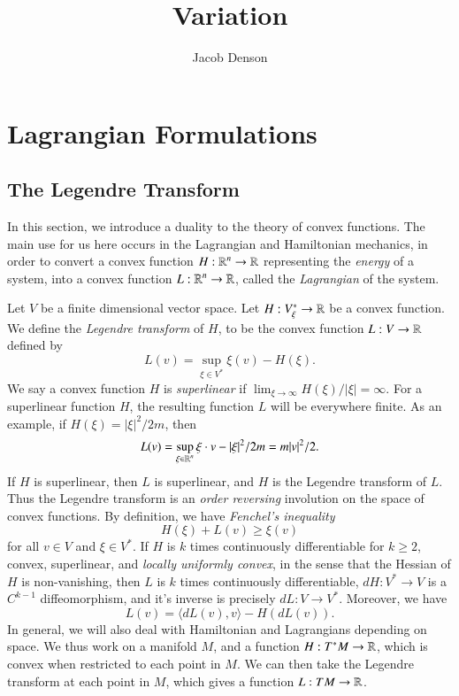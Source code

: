 


\title{Variation}
\author{Jacob Denson}




\maketitle








\chapter{Lagrangian Formulations}

\section{The Legendre Transform}

In this section, we introduce a duality to the theory of convex functions. The main use for us here occurs in the Lagrangian and Hamiltonian mechanics, in order to convert a convex function $H: \operatorname{\mathbb{R}}^n \to \operatorname{\mathbb{R}}$ representing the \emph{energy} of a system, into a convex function $L: \operatorname{\mathbb{R}}^n \to \operatorname{\mathbb{R}}$, called the \emph{Lagrangian} of the system.

Let $V$ be a finite dimensional vector space. Let $H: V^*_\xi \to \operatorname{\mathbb{R}}$ be a convex function. We define the \emph{Legendre transform} of $H$, to be the convex function $L: V \to \operatorname{\mathbb{R}}$ defined by
%
\[ L(v) = \sup_{\xi \in V^*} \xi(v) - H(\xi). \]
%
We say a convex function $H$ is \emph{superlinear} if $\lim_{\xi \to \infty} H(\xi) / |\xi| = \infty$. For a superlinear function $H$, the resulting function $L$ will be everywhere finite. As an example, if $H(\xi) = |\xi|^2/2 m$, then
%
\[ L(v) = \sup_{\xi \in \operatorname{\mathbb{R}}^n} \xi \cdot v - |\xi|^2/2m = m |v|^2 / 2. \]
%
If $H$ is superlinear, then $L$ is superlinear, and $H$ is the Legendre transform of $L$. Thus the Legendre transform is an \emph{order reversing} involution on the space of convex functions. By definition, we have \emph{Fenchel's inequality}
%
\[ H(\xi) + L(v) \geq \xi(v) \]
%
for all $v \in V$ and $\xi \in V^*$. If $H$ is $k$ times continuously differentiable for $k \geq 2$, convex, superlinear, and \emph{locally uniformly convex}, in the sense that the Hessian of $H$ is non-vanishing, then $L$ is $k$ times continuously differentiable, $dH: V^* \to V$ is a $C^{k-1}$ diffeomorphism, and it's inverse is precisely $dL: V \to V^*$. Moreover, we have
%
\[ L(v) = \langle dL(v), v \rangle - H(dL(v)). \]
%
In general, we will also deal with Hamiltonian and Lagrangians depending on space. We thus work on a manifold $M$, and a function $H: T^*M \to \operatorname{\mathbb{R}}$, which is convex when restricted to each point in $M$. We can then take the Legendre transform at each point in $M$, which gives a function $L: TM \to \operatorname{\mathbb{R}}$.

